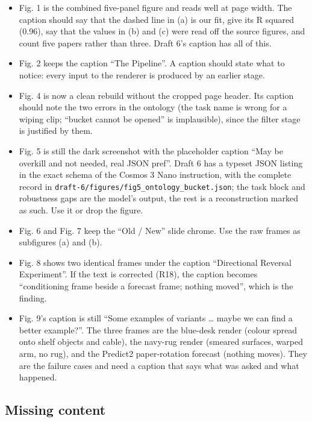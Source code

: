 \documentclass[
  11pt,
]{article}
\providecommand{\tightlist}{%
  \setlength{\itemsep}{0pt}\setlength{\parskip}{0pt}}
\begin{document}
\begin{itemize}
\tightlist
\item
  Fig. 1 is the combined five-panel figure and reads well at page width.
  The caption should say that the dashed line in (a) is our fit, give
  its R squared (0.96), say that the values in (b) and (c) were read off
  the source figures, and count five papers rather than three. Draft 6's
  caption has all of this.
\item
  Fig. 2 keeps the caption ``The Pipeline''. A caption should state what
  to notice: every input to the renderer is produced by an earlier
  stage.
\item
  Fig. 4 is now a clean rebuild without the cropped page header. Its
  caption should note the two errors in the ontology (the task name is
  wrong for a wiping clip; ``bucket cannot be opened'' is implausible),
  since the filter stage is justified by them.
\item
  Fig. 5 is still the dark screenshot with the placeholder caption ``May
  be overkill and not needed, real JSON pref''. Draft 6 has a typeset
  JSON listing in the exact schema of the Cosmos 3 Nano instruction,
  with the complete record in
  \texttt{draft-6/figures/fig5\_ontology\_bucket.json}; the task block
  and robustness gaps are the model's output, the rest is a
  reconstruction marked as such. Use it or drop the figure.
\item
  Fig. 6 and Fig. 7 keep the ``Old / New'' slide chrome. Use the raw
  frames as subfigures (a) and (b).
\item
  Fig. 8 shows two identical frames under the caption ``Directional
  Reversal Experiment''. If the text is corrected (R18), the caption
  becomes ``conditioning frame beside a forecast frame; nothing moved'',
  which is the finding.
\item
  Fig. 9's caption is still ``Some examples of variants \ldots{} maybe
  we can find a better example?''. The three frames are the blue-desk
  render (colour spread onto shelf objects and cable), the navy-rug
  render (smeared surfaces, warped arm, no rug), and the Predict2
  paper-rotation forecast (nothing moves). They are the failure cases
  and need a caption that says what was asked and what happened.
\end{itemize}

\subsection{Missing content}\label{missing-content}
\end{document}

